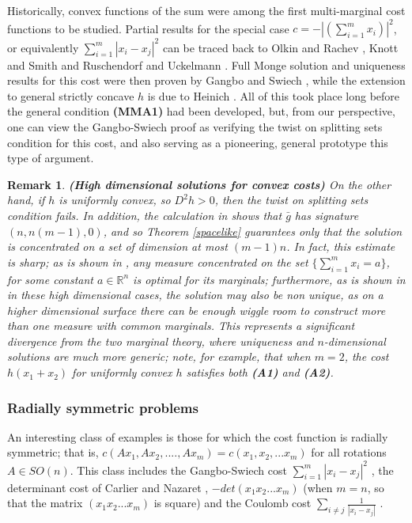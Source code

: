 \documentclass[letter,10pt]{article}
\theoremstyle{dotless}
\begin{document}
Historically, convex functions of the sum were among the first multi-marginal cost functions to be studied.  Partial results for the special case $c=-|(\sum_{i=1}^m x_i)|^2$, or equivalently $\sum_{i=1}^m|x_i-x_j|^2$ can be traced back to Olkin and Rachev \cite{OR}, Knott and Smith \cite{KS} and Ruschendorf and Uckelmann \cite{RU}.  Full Monge solution and uniqueness results for this cost were then proven by Gangbo and Swiech \cite{GS}, while the extension to general strictly concave $h$ is due to Heinich \cite{H}.  All of this took place long before the general condition \textbf{(MMA1)} had been developed, but, from our perspective, one can view the Gangbo-Swiech proof as verifying the twist on splitting sets condition for this cost, and also serving as a pioneering, general prototype this type of argument.
\newtheorem{highdconvex}{Remark}[subsection]
\begin{highdconvex}\label{highdconvex}
\textbf{(High dimensional solutions for convex costs)} On the other hand, if $h$ is uniformly convex, so $D^2h>0$, then the twist on splitting sets condition fails.  In addition, the calculation in \cite{P4} shows that $\bar g$ has signature  $(n,n(m-1),0)$, and so Theorem \ref{spacelike}  guarantees only that the solution is concentrated on a set of dimension at most $(m-1)n$.    In fact, this estimate is sharp; as is shown in \cite{P}, any measure concentrated on the set $\{\sum_{i=1}^mx_i=a\}$, for some constant $a \in \mathbb{R}^n$ is optimal for its marginals; furthermore, as is shown in \cite{P4} in these high dimensional cases, the solution may also be non unique, as on a higher dimensional surface there can be enough wiggle room to construct more than one measure with common marginals. This  represents a significant divergence from the two marginal theory, where uniqueness and $n$-dimensional solutions are much more generic; note, for example, that when $m=2$, the cost $h(x_1 +x_2)$ for uniformly convex $h$ satisfies both \textbf{(A1)} and \textbf{(A2)}.
\end{highdconvex}
\subsubsection{Radially symmetric problems}
An interesting class of examples is those for which the cost function is radially symmetric; that is, $c(Ax_1,Ax_2,....,Ax_m) =c(x_1,x_2,...x_m)$ for all rotations $A \in SO(n)$.  This class includes the Gangbo-Swiech cost $\sum_{i=1}^m|x_i-x_j|^2$ \cite{GS}, the determinant cost of Carlier and Nazaret \cite{CN}, $-det(x_1x_2...x_m)$ (when $m=n$, so that the matrix $(x_1x_2...x_m)$ is square) and the Coulomb cost $\sum_{i \neq j}\frac{1}{|x_i-x_j|}$ \cite{CFK}\cite{bdpgg}.
\end{document}
